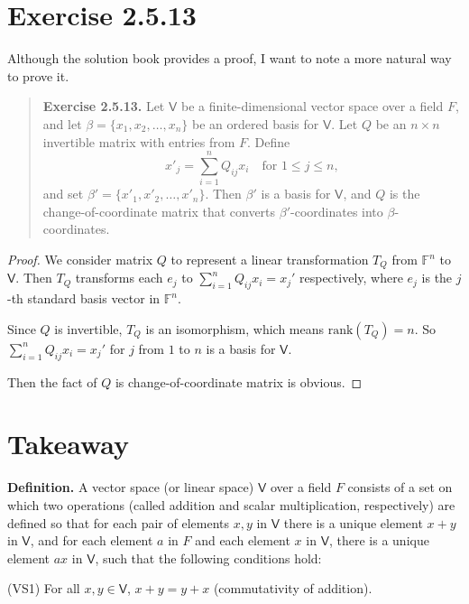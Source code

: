 \documentclass{article}
\newcommand{\0}{\mathit{0}}
\begin{document}
\section{Exercise 2.5.13}
Although the solution book provides a proof, I want to note a more natural way to prove it.

\begin{quotation}
    \textbf{Exercise 2.5.13.} Let $\mathsf{V}$ be a finite-dimensional vector space over a field $F$, and let
    $\beta = \{x_1, x_2, \dots, x_n\}$ be an ordered basis for $\mathsf{V}$. Let $Q$ be an $n \times n$
    invertible matrix with entries from $F$. Define
    \[
        x'_j = \sum_{i=1}^{n} Q_{ij} x_i \quad \text{for } 1 \leq j \leq n,
    \]
    and set $\beta' = \{x'_1, x'_2, \dots, x'_n\}$.
    Then $\beta'$ is a basis for $\mathsf{V}$, and $Q$ is the change-of-coordinate matrix
    that converts $\beta'$-coordinates into $\beta$-coordinates.
\end{quotation}

\begin{proof}
    We consider matrix $Q$ to represent a linear transformation $T_Q$ from $\mathbb{F}^n$ to
    $\mathsf{V}$. Then $T_Q$ transforms each $e_j$ to $\sum_{i=1}^{n} Q_{ij} x_i=x_j'$
    respectively, where $e_j$ is the $j$-th standard basis vector in $\mathbb{F}^n$.

    Since $Q$ is invertible, $T_Q$ is an isomorphism, which means $\mathrm{rank}(T_Q) = n$.
    So $\sum_{i=1}^{n} Q_{ij} x_i=x_j'$ for $j$ from $1$ to $n$ is a basis for $\mathsf{V}$.

    Then the fact of $Q$ is change-of-coordinate matrix is obvious.
\end{proof}

\newpage

\section{Takeaway}

\textbf{Definition.}
A vector space (or linear space) $\mathsf{V}$ over a field $F$ consists of
a set on which two operations (called addition and scalar multiplication,
respectively) are defined so that for each pair of elements $x, y$ in
$\mathsf{V}$ there is a unique element $x + y$ in $\mathsf{V}$, and for
each element $a$ in $F$ and each element $x$ in $\mathsf{V}$, there is a
unique element $ax$ in $\mathsf{V}$, such that the following conditions hold:

(VS1) For all $x, y \in \mathsf{V}$, $x + y = y + x$ (commutativity of addition).
\end{document}
